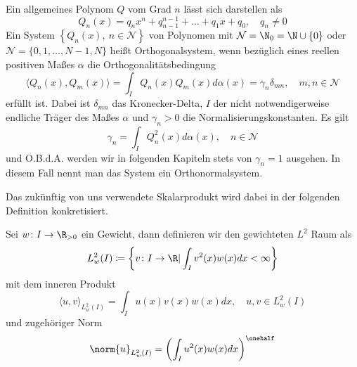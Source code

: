 \begin{mathdef}
Ein allgemeines Polynom $Q$ vom Grad $n$ lässt sich darstellen als
\[Q_n(x)=q_nx^n+q_{n-1}^{n-1}+\dots+q_1x+q_0,\quad q_n\ne 0\]
Ein System $\left\lbrace Q_n(x),\: n\in\mathcal{N}\right\rbrace$ von Polynomen mit $\mathcal{N}=\N_0=\N\cup\lbrace 0\rbrace$ oder $\mathcal{N}=\lbrace 0,1,\dots,N-1,N\rbrace$ heißt Orthogonalsystem, wenn bezüglich eines reellen positiven Maßes $\alpha$ die Orthogonalitätsbedingung
 \[\langle Q_n(x),Q_m(x)\rangle =\int_I Q_n(x)Q_m(x)d\alpha(x)=\gamma_n\delta_{mn},\quad m,n\in\mathcal{N}\]
 erfüllt ist. Dabei ist $\delta_{mn}$ das Kronecker-Delta, $I$ der nicht notwendigerweise endliche Träger des Maßes $\alpha$ und $\gamma_n>0$ die Normalisierungskonstanten. Es gilt 
 \[\gamma_n=\int_I Q_n^2(x)d\alpha(x),\quad n\in\mathcal{N}\] und O.B.d.A. werden wir in folgenden Kapiteln stets von $\gamma_n=1$ ausgehen. In diesem Fall nennt man das System ein Orthonormalsystem.
\end{mathdef}
Das zukünftig von uns verwendete Skalarprodukt wird dabei in der folgenden Definition konkretisiert.
\begin{mathdef}
Sei $w\colon I\to\R_{>0}$ ein Gewicht, dann definieren wir den gewichteten $L^2$ Raum als
\begin{equation*}
L_w^2(I)\coloneqq \left\lbrace v\colon I\to\R | \int_Iv^2(x)w(x)dx<\infty\right\rbrace
\end{equation*}
mit dem inneren Produkt 
\[\langle u,v\rangle_{L_w^2(I)}=\int_I u(x)v(x)w(x)dx,\quad u,v\in L_w^2(I)\]
und zugehöriger Norm
\[\norm{u}_{L_w^2(I)}=\left(\int_I u^2(x)w(x)dx\right)^{\onehalf}\]
\end{mathdef}

